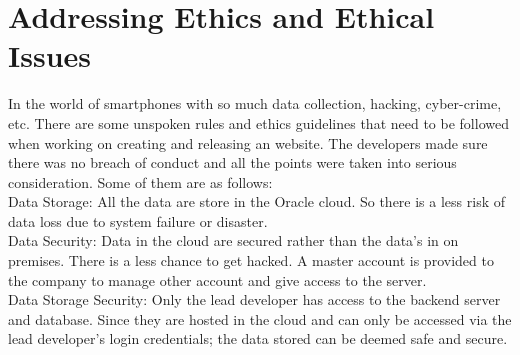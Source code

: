 \section{Addressing Ethics and Ethical Issues }

In the world of smartphones with so much data collection, hacking, cyber-crime, etc. There are some unspoken rules and ethics guidelines that need to be followed when working on creating and releasing an website. The developers made sure there was no breach of conduct and all the points were taken into serious consideration. Some of them are as follows: \\[2ex]

Data Storage: All the data are store in the Oracle cloud. So there is a less risk of data loss due to system failure or disaster.  \\[2ex]

Data Security: Data in the cloud are secured rather than the data's in on premises. There is a less chance to get hacked. A master account is provided to the company to manage other account and give access to the server.  \\[2ex]

Data Storage Security: Only the lead developer has access to the backend server and database. Since they are hosted in the cloud and can only be accessed via the lead developer's login credentials; the data stored can be deemed safe and secure. \\[2ex]








